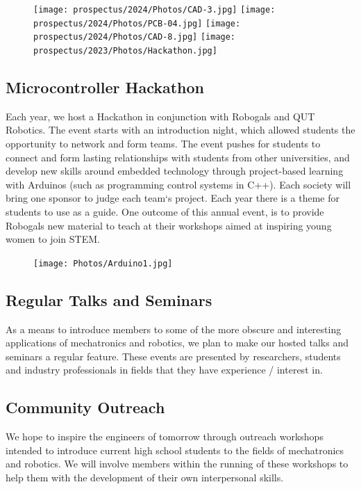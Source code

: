 \documentclass[a4paper,12pt]{report}
\begin{document}
\begin{figure}[H]
    \centering
    \texttt{[image: prospectus/2024/Photos/CAD-3.jpg]}
    \texttt{[image: prospectus/2024/Photos/PCB-04.jpg]}
    \texttt{[image: prospectus/2024/Photos/CAD-8.jpg]}
    \texttt{[image: prospectus/2023/Photos/Hackathon.jpg]}
\end{figure}


\newpage

\subsection*{Microcontroller Hackathon}
Each year, we host a Hackathon in conjunction with Robogals and QUT Robotics.
The event starts with an introduction night, which allowed students the opportunity to network and form teams.
The event pushes for students to connect and form lasting relationships with students from other universities, and develop new skills around embedded technology through project-based learning with Arduinos (such as programming control systems in C++).
Each society will bring one sponsor to judge each team`s project. Each year there is a theme for students to use as a guide.
One outcome of this annual event, is to provide Robogals new material to teach at their workshops aimed at inspiring young women to join STEM.

\begin{figure}[H]
    \centering
    \texttt{[image: Photos/Arduino1.jpg]}
\end{figure}


\subsection*{Regular Talks and Seminars} 
As a means to introduce members to some of the more obscure and interesting applications of mechatronics and robotics, we plan to make our hosted talks and seminars a regular feature.
These events are presented by researchers, students and industry professionals in fields that they have experience / interest in.

\subsection*{Community Outreach}
We hope to inspire the engineers of tomorrow through outreach workshops intended to introduce current high school students to the fields of mechatronics and robotics.
We will involve members within the running of these workshops to help them with the development of their own interpersonal skills.
\end{document}
